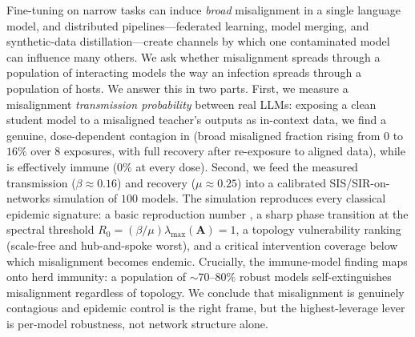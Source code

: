 Fine-tuning on narrow tasks can induce \emph{broad} misalignment in a single
language model, and distributed pipelines---federated learning, model merging,
and synthetic-data distillation---create channels by which one contaminated
model can influence many others. We ask whether misalignment spreads through a
population of interacting models the way an infection spreads through a
population of hosts. We answer this in two parts. First, we measure a
misalignment \emph{transmission probability} between real LLMs: exposing a clean
student model to a misaligned teacher's outputs as in-context data, we find a
genuine, dose-dependent contagion in \llama (broad misaligned fraction rising
from $0$ to $16\%$ over $8$ exposures, with full recovery after re-exposure to
aligned data), while \gptmini is effectively immune ($0\%$ at every dose).
Second, we feed the measured transmission ($\beta\!\approx\!0.16$) and recovery
($\mu\!\approx\!0.25$) into a calibrated SIS/SIR-on-networks simulation of $100$
models. The simulation reproduces every classical epidemic signature: a basic
reproduction number \Rzero, a sharp phase transition at the spectral threshold
$R_0=(\beta/\mu)\lambda_{\max}(\mathbf{A})=1$, a topology vulnerability ranking
(scale-free and hub-and-spoke worst), and a critical intervention coverage below
which misalignment becomes endemic. Crucially, the immune-model finding maps onto
herd immunity: a population of ${\sim}70\text{--}80\%$ robust models
self-extinguishes misalignment regardless of topology. We conclude that
misalignment is genuinely contagious and epidemic control is the right frame, but
the highest-leverage lever is per-model robustness, not network structure alone.
